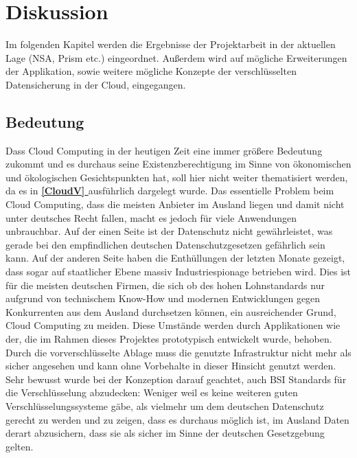 \documentclass[13pt,a4paper,bibliography=totocnumbered,listof=totocnumbered]{scrartcl}
\newcommand*{\fullref}[1]{\textbf{\hyperref[{#1}]{\ref*{#1} \nameref*{#1}}}}
\begin{document}
\section{Diskussion}\label{DiskussionV}
Im folgenden Kapitel werden die Ergebnisse der Projektarbeit in der aktuellen Lage (NSA, Prism etc.) eingeordnet. Außerdem wird auf mögliche Erweiterungen der Applikation, sowie weitere mögliche Konzepte der verschlüsselten Datensicherung in der Cloud, eingegangen. 

\subsection{Bedeutung}
Dass Cloud Computing in der heutigen Zeit eine immer größere Bedeutung zukommt und es durchaus seine Existenzberechtigung im Sinne von ökonomischen und ökologischen Gesichtspunkten hat, soll hier nicht weiter thematisiert werden, da es in \fullref{CloudV} ausführlich dargelegt wurde. Das essentielle Problem beim Cloud Computing, dass die meisten Anbieter im Ausland liegen und damit nicht unter deutsches Recht fallen, macht es jedoch für viele Anwendungen unbrauchbar. Auf der einen Seite ist der Datenschutz nicht gewährleistet, was gerade bei den empfindlichen deutschen Datenschutzgesetzen gefährlich sein kann. Auf der anderen Seite haben die Enthüllungen der letzten Monate gezeigt, dass sogar auf staatlicher Ebene massiv Industriespionage betrieben wird. Dies ist für die meisten deutschen Firmen, die sich ob des hohen Lohnstandards nur aufgrund von technischem Know-How und modernen Entwicklungen gegen Konkurrenten aus dem Ausland durchsetzen können, ein ausreichender Grund, Cloud Computing zu meiden. Diese Umstände werden durch Applikationen wie der, die im Rahmen dieses Projektes prototypisch entwickelt wurde, behoben. Durch die vorverschlüsselte Ablage muss die genutzte Infrastruktur nicht mehr als sicher angesehen und kann ohne Vorbehalte in dieser Hinsicht genutzt werden. Sehr bewusst wurde bei der Konzeption darauf geachtet, auch BSI Standards für die Verschlüsselung abzudecken: Weniger weil es keine weiteren guten Verschlüsselungssysteme gäbe, als vielmehr um dem deutschen Datenschutz gerecht zu werden und zu zeigen, dass es durchaus möglich ist, im Ausland Daten derart abzusichern, dass sie als sicher im Sinne der deutschen Gesetzgebung gelten.
\end{document}
